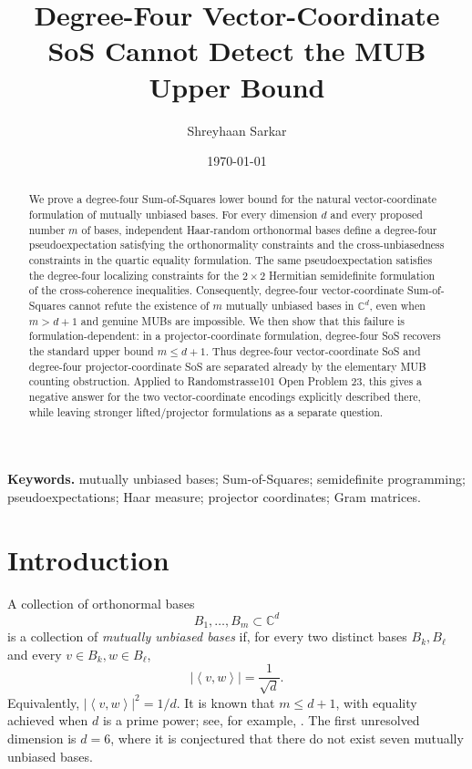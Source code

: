 \documentclass[11pt]{article}
\title{Degree-Four Vector-Coordinate SoS Cannot Detect the MUB Upper Bound}
\author{Shreyhaan Sarkar}
\date{\today}
\theoremstyle{remark}
\newcommand{\C}{\mathbb{C}}
\newcommand{\ip}[2]{\left\langle #1,#2\right\rangle}
\begin{document}
\maketitle

\begin{abstract}
We prove a degree-four Sum-of-Squares lower bound for the natural vector-coordinate formulation of mutually unbiased bases. For every dimension $d$ and every proposed number $m$ of bases, independent Haar-random orthonormal bases define a degree-four pseudoexpectation satisfying the orthonormality constraints and the cross-unbiasedness constraints in the quartic equality formulation. The same pseudoexpectation satisfies the degree-four localizing constraints for the $2\times 2$ Hermitian semidefinite formulation of the cross-coherence inequalities. Consequently, degree-four vector-coordinate Sum-of-Squares cannot refute the existence of $m$ mutually unbiased bases in $\C^d$, even when $m>d+1$ and genuine MUBs are impossible. We then show that this failure is formulation-dependent: in a projector-coordinate formulation, degree-four SoS recovers the standard upper bound $m\le d+1$. Thus degree-four vector-coordinate SoS and degree-four projector-coordinate SoS are separated already by the elementary MUB counting obstruction. Applied to Randomstrasse101 Open Problem 23, this gives a negative answer for the two vector-coordinate encodings explicitly described there, while leaving stronger lifted/projector formulations as a separate question.
\end{abstract}

\begin{center}
\small
\textbf{Keywords.} mutually unbiased bases; Sum-of-Squares; semidefinite programming; pseudoexpectations; Haar measure; projector coordinates; Gram matrices.
\end{center}

\section{Introduction}

A collection of orthonormal bases
\[
B_1,\ldots,B_m\subset \C^d
\]
is a collection of \emph{mutually unbiased bases} if, for every two distinct bases $B_k,B_\ell$ and every $v\in B_k,w\in B_\ell$,
\[
|\ip{v}{w}|=\frac{1}{\sqrt d}.
\]
Equivalently, $|\ip{v}{w}|^2=1/d$. It is known that $m\le d+1$, with equality achieved when $d$ is a prime power; see, for example, \cite{BBRV2002}. The first unresolved dimension is $d=6$, where it is conjectured that there do not exist seven mutually unbiased bases.
\end{document}
